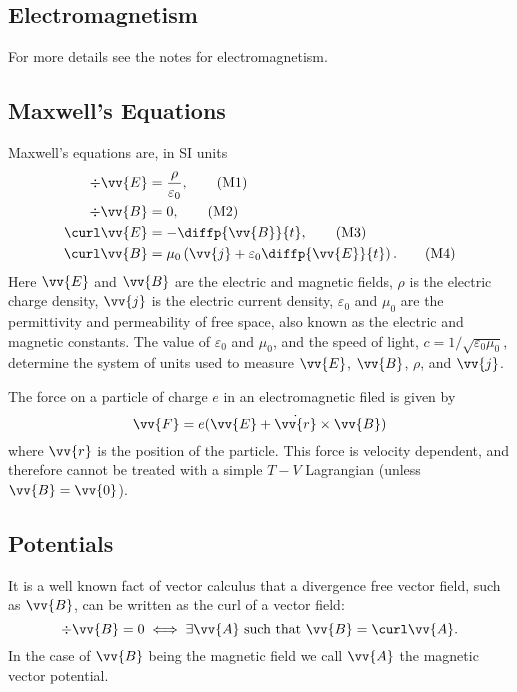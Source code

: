 \documentclass[fleqn]{NotesClass}
\begin{document}
    \appendixpage
    \begin{appendices}
        
        \chapter{Electromagnetism}\label{sec:electromagnetism}
        \begin{rmk}
            For more details see the notes for electromagnetism.
        \end{rmk}
        \section{Maxwell's Equations}
        Maxwell's equations are, in SI units
        \begin{align}
            \div \vv{E} &= \frac{\rho}{\varepsilon_0}, \tag{M1}\\
            \div \vv{B} &= 0, \tag{M2}\\
            \curl \vv{E} &= -\diffp{\vv{B}}{t}, \tag{M3}\\
            \curl \vv{B} &= \mu_0\left( \vv{j} + \varepsilon_0\diffp{\vv{E}}{t} \right). \tag{M4}
        \end{align}
        Here \(\vv{E}\) and \(\vv{B}\) are the electric and magnetic fields, \(\rho\) is the electric charge density, \(\vv{j}\) is the electric current density, \(\varepsilon_0\) and \(\mu_0\) are the permittivity and permeability of free space, also known as the electric and magnetic constants.
        The value of \(\varepsilon_0\) and \(\mu_0\), and the speed of light, \(c = 1/\sqrt{\varepsilon_0\mu_0}\), determine the system of units used to measure \(\vv{E}\), \(\vv{B}\), \(\rho\), and \(\vv{j}\).
        
        The force on a particle of charge \(e\) in an electromagnetic filed is given by
        \begin{equation}
            \vv{F} = e(\vv{E} + \dot{\vv{r}}\times\vv{B})
        \end{equation}
        where \(\vv{r}\) is the position of the particle.
        This force is velocity dependent, and therefore cannot be treated with a simple \(T - V\) Lagrangian (unless \(\vv{B} = \vv{0}\)).
        
        \section{Potentials}
        It is a well known fact of vector calculus that a divergence free vector field, such as \(\vv{B}\), can be written as the curl of a vector field:
        \begin{equation}
            \div \vv{B} = 0 \iff \exists \vv{A} \text{ such that } \vv{B} = \curl \vv{A}.
        \end{equation}
        In the case of \(\vv{B}\) being the magnetic field we call \(\vv{A}\) the magnetic vector potential.
        

\end{appendices}
\end{document}
